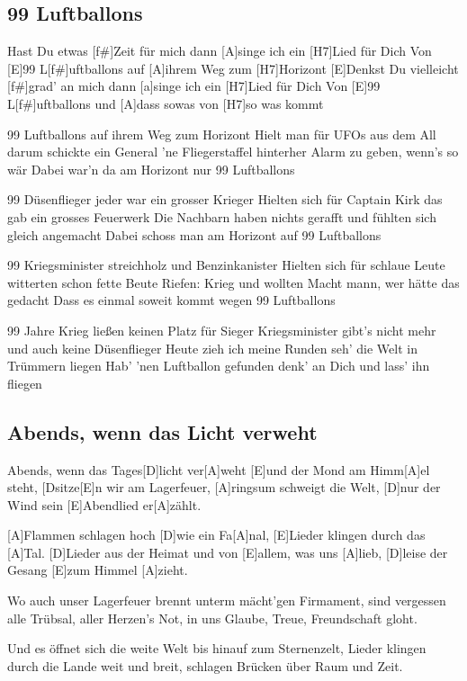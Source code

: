 \documentclass[10pt,a5paper,twoside, cleardoubleplain]{scrbook}
\begin{document}
\subsection{99 Luftballons}
\begin{guitar}
[E]Hast Du etwas [f#]Zeit für mich dann [A]singe ich ein [H7]Lied für Dich
Von [E]99 L[f#]uftballons auf [A]ihrem Weg zum [H7]Horizont
[E]Denkst Du vielleicht [f#]grad' an mich dann [a]singe ich ein [H7]Lied für Dich
Von [E]99 L[f#]uftballons und [A]dass sowas von [H7]so was kommt

99 Luftballons auf ihrem Weg zum Horizont
Hielt man für UFOs aus dem All darum schickte ein General
'ne Fliegerstaffel hinterher Alarm zu geben, wenn's so wär
Dabei war'n da am Horizont nur 99 Luftballons

99 Düsenflieger jeder war ein grosser Krieger
Hielten sich für Captain Kirk das gab ein grosses Feuerwerk
Die Nachbarn haben nichts gerafft und fühlten sich gleich angemacht
Dabei schoss man am Horizont auf 99 Luftballons

99 Kriegsminister streichholz und Benzinkanister
Hielten sich für schlaue Leute witterten schon fette Beute
Riefen: Krieg und wollten Macht mann, wer hätte das gedacht
Dass es einmal soweit kommt wegen 99 Luftballons

99 Jahre Krieg ließen keinen Platz für Sieger
Kriegsminister gibt's nicht mehr und auch keine Düsenflieger
Heute zieh ich meine Runden seh' die Welt in Trümmern liegen
Hab' 'nen Luftballon gefunden denk' an Dich und lass' ihn fliegen
\end{guitar}

  	  
\newpage  

  	
\subsection{Abends, wenn das Licht verweht}

\begin{guitar}
[A]Abends, wenn das Tages[D]licht ver[A]weht
[E]und der Mond am Himm[A]el steht,
[Dsitze[E]n wir am Lagerfeuer, [A]ringsum schweigt die Welt,
[D]nur der Wind sein [E]Abendlied er[A]zählt.

[A]Flammen schlagen hoch [D]wie ein Fa[A]nal,
[E]Lieder klingen durch das [A]Tal.
[D]Lieder aus der Heimat und von [E]allem, was uns [A]lieb,
[D]leise der Gesang [E]zum Himmel [A]zieht.

Wo auch unser Lagerfeuer brennt
unterm mächt’gen Firmament,
sind vergessen alle Trübsal, aller Herzen’s Not, 
in uns Glaube, Treue, Freundschaft gloht.

Und es öffnet sich die weite Welt
bis hinauf zum Sternenzelt,
Lieder klingen durch die Lande weit und breit,
schlagen Brücken über Raum und Zeit.
\end{guitar}
\end{document}
